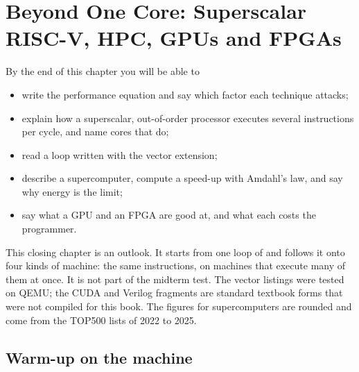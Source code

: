 \chapter{Beyond One Core: Superscalar RISC-V, HPC, GPUs and FPGAs}
\label{ch:beyond}


\begin{chapgoals}
By the end of this chapter you will be able to
\begin{itemize}
\item write the performance equation and say which factor each technique attacks;
\item explain how a superscalar, out-of-order processor executes several
  instructions per cycle, and name \riscv cores that do;
\item read a loop written with the \riscv vector extension;
\item describe a supercomputer, compute a speed-up with Amdahl's law, and say why energy is the limit;
\item say what a GPU and an FPGA are good at, and what each costs the programmer.
\end{itemize}
\end{chapgoals}


This closing chapter is an outlook. It starts from one loop of \vermone and
follows it onto four kinds of machine: the same instructions, on machines
that execute many of them at once. It is not part of the midterm test. The
\riscv vector listings were tested on QEMU; the CUDA and Verilog fragments
are standard textbook forms that were not compiled for this book. The
figures for supercomputers are rounded and come from the TOP500 lists of 2022
to 2025.

\section{Warm-up on the machine}


